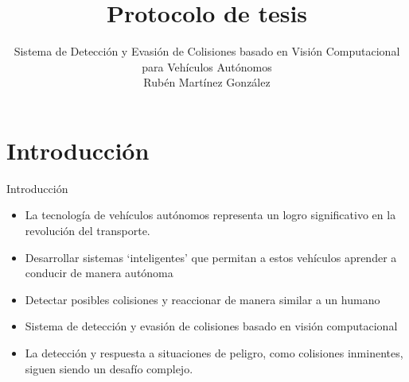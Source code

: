 \documentclass[8pt]{beamer}
\author[]
{Sistema de Detección y Evasión de Colisiones basado en Visión Computacional para Vehículos Autónomos\\
\vspace{2em}
Rubén Martínez González}
\title[Protocolo de tesis]{Protocolo de tesis}
\institute[FMAT, UADY]{Facultad de Matemáticas, UADY}
\date{}
\begin{document}
    \begin{frame}
        \titlepage
    \end{frame}



    \section{Introducción}
    \begin{frame}{Introducción}
        \begin{itemize}
            \item La tecnología de vehículos autónomos representa un logro significativo en la revolución del transporte.
            \item Desarrollar sistemas ‘inteligentes’ que permitan a estos vehículos aprender a conducir de manera autónoma
            \item Detectar posibles colisiones y reaccionar de manera similar a un humano
            \item Sistema de detección y evasión de colisiones basado en visión computacional
            \item La detección y respuesta a situaciones de peligro, como colisiones inminentes, siguen siendo un desafío complejo.
        \end{itemize}
    \end{frame}
\end{document}
